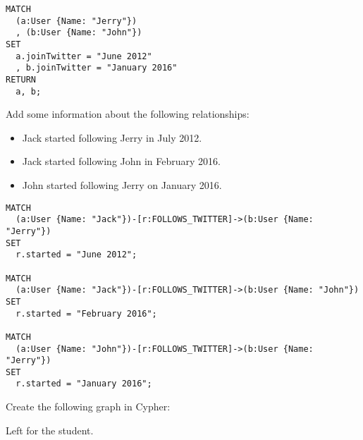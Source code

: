 \documentclass[a4paper,12pt]{exam}
\begin{document}
\begin{questions}
\begin{solution}
\begin{verbatim}
MATCH
  (a:User {Name: "Jerry"})
  , (b:User {Name: "John"})
SET
  a.joinTwitter = "June 2012"
  , b.joinTwitter = "January 2016"
RETURN
  a, b;
  \end{verbatim}
\end{solution}

\question
Add some information about the following relationships:
\begin{itemize}
  \item Jack started following Jerry in July 2012.
  \item Jack started following John in February 2016.
  \item John started following Jerry on January 2016.
\end{itemize}

\begin{solution}
  \begin{verbatim}
MATCH
  (a:User {Name: "Jack"})-[r:FOLLOWS_TWITTER]->(b:User {Name: "Jerry"})
SET
  r.started = "June 2012";
	
MATCH
  (a:User {Name: "Jack"})-[r:FOLLOWS_TWITTER]->(b:User {Name: "John"})
SET
  r.started = "February 2016";
	
MATCH
  (a:User {Name: "John"})-[r:FOLLOWS_TWITTER]->(b:User {Name: "Jerry"})
SET
  r.started = "January 2016";
  \end{verbatim}
\end{solution}

\question
  Create the following graph in Cypher:
  \begin{center}
  \end{center}
\begin{solution}
Left for the student.
\end{solution}



\end{questions}
\end{document}
